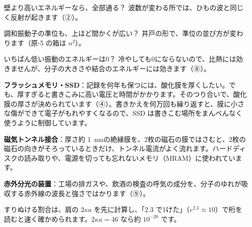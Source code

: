 \begin{tsumazuki}{壁より高いエネルギーなら、全部通る？}
波数が変わる所では、ひもの波と同じく反射が起きます（②）。
\end{tsumazuki}

\begin{tsumazuki}{調和振動子の準位も、上ほど間かくが広い？}
井戸の形で、準位の並び方が変わります（原-5 の箱は $n^2$）。
\end{tsumazuki}

\begin{tsumazuki}{いちばん低い振動のエネルギーは0？}
冷やしても0にならないので、比熱には効きませんが、分子の大きさや結合のエネルギーには効きます（⑧）。
\end{tsumazuki}

\begin{phkougaku}
\textbf{フラッシュメモリ・SSD}：記録を何年も保つには、酸化膜を厚くしたい。でも、厚すぎると書きこみに高い電圧と時間がかかります。そのつり合いで、酸化膜の厚さが決められています（④）。書きかえを何万回も繰り返すと、膜に小さな傷ができて電子がもれやすくなるので、SSD は書きこむ場所をまんべんなく使うように制御しています。

\textbf{磁気トンネル接合}：厚さ約 \qty{1}{nm}の絶縁膜を、2枚の磁石の膜ではさむと、2枚の磁石の向きがそろっているときだけ、トンネル電流がよく流れます。ハードディスクの読み取りや、電源を切っても忘れないメモリ（MRAM）に使われています。

\textbf{赤外分光の装置}：工場の排ガスや、飲酒の検査の呼気の成分を、分子のゆれが吸収する赤外線の波長と強さではかります（⑨）。

\begin{phketa}[トンネル効果と分子のゆれの数の目安]
すりぬける割合は、肩の $2\kappa a$ を先に計算し、「2.3 で1けた」（$e^{2.3}\approx10$）で桁を読むと速く確かめられます。$2\kappa a=46$ なら約 $10^{-20}$ です。
\end{phketa}
\end{phkougaku}

